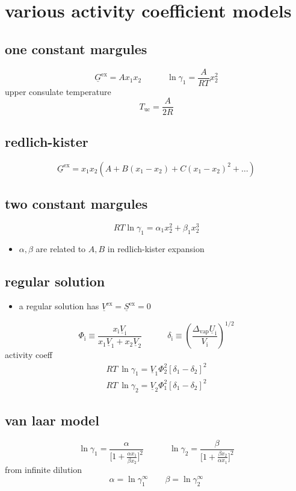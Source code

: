 \documentclass{article}
\begin{document}
\section*{various activity coefficient models}
\subsection*{one constant margules}
\[ \underline{G}^{\mathrm{ex}} = Ax_{1}x_{2} \hspace{3em} \ln \gamma_{1} = \frac{A}{RT}x_{2}^{2} \]
upper consulate temperature
\[ T_\mathrm{uc} = \frac{A}{2R} \]
\subsection*{redlich-kister}
\[ \underline{G}^{\mathrm{ex}} = x_{1}x_{2} (A + B(x_{1}-x_{2}) + C(x_{1}-x_{2})^{2} + \dots) \]
\subsection*{two constant margules}
\[ RT \ln \gamma_{1} = \alpha_{1}x_{2}^{2} + \beta_{1}x_{2}^{3} \]
\begin{itemize}
    \item $\alpha, \beta$ are related to $A,B$ in redlich-kister expansion
\end{itemize}
\subsection*{regular solution}
\begin{itemize}
    \item a regular solution has $\underline{V}^{\mathrm{ex}} = \underline{S}^{\mathrm{ex}} = 0$
\end{itemize}
\[\Phi_{\mathrm{i}}\equiv{\frac{x_{\mathrm{i}}\underline{V}_{\mathrm{i}}}{x_{1}\underline{{{V}}}_{1}+x_{2}\underline{{{V}}}_{2}}} \hspace{3em} \delta_{\mathrm{i}}\equiv\left(\frac{\Delta_{\mathrm{vap}}\underline{U}_{\mathrm{i}}}{V_{\mathrm{i}}}\right)^{1/2}\]
activity coeff
\[\begin{array}{l}{{R T\ \ln\gamma_{1}=\underline{{{V}}}_{1}\Phi_{2}^{2}[\delta_{1}-\delta_{2}]^{2}}}\\ {{R T\ \ln\gamma_{2}=\underline{{{V}}}_{2}\Phi_{1}^{2}[\delta_{1}-\delta_{2}]^{2}}}\end{array}\nonumber\]
\subsection*{van laar model}
\[ \ln \gamma_{1} = \frac{\alpha}{\biggl[  1+ \displaystyle\frac{\alpha x_{1}}{\beta x_{2}} \biggr]^{2}} \hspace{3em} \ln \gamma_{2} = \frac{\beta}{\biggl[  1+ \displaystyle\frac{\beta x_{2}}{\alpha x_{1}} \biggr]^{2}} \]
from infinite dilution
\[
\alpha = \ln \gamma_{1}^{\infty} \quad \quad \beta = \ln \gamma_{2}^{\infty}
\]
\end{document}

